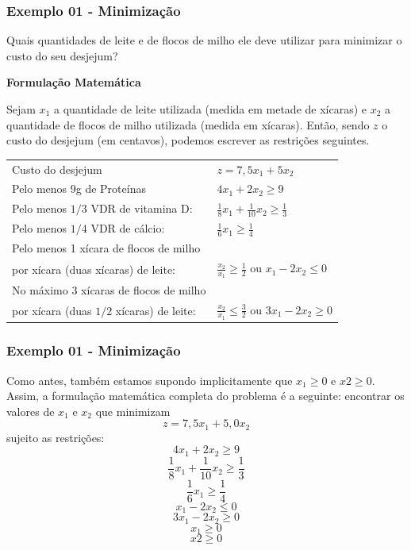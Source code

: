 \documentclass[hyperref={pdfpagelabels=false}]{beamer}
\begin{document}
\begin{frame}
\frametitle{Exemplo 01 - Minimização}

Quais quantidades de leite e de flocos de milho ele deve utilizar para minimizar o custo do seu desjejum? \pause

{\bf Formulação Matemática}

Sejam $x_1$ a quantidade de leite utilizada (medida em metade de xícaras) e $x_2$ a quantidade de flocos de milho utilizada (medida em xícaras). Então, sendo $z$ o custo do desjejum (em centavos), podemos escrever as restrições seguintes.

\begin{table}[h]
	\centering
	\begin{tabular}{ll}
		\hline
		Custo do desjejum		&	$z = 7,5x_1 + 5x_2$ \\
		Pelo menos $9$g de Proteínas	&	$4x_1+2x_2\geq 9$ \\
		Pelo menos $1/3$  VDR de vitamina D: &	$\frac{1}{8}x_1+\frac{1}{10}x_2 \geq \frac{1}{3}$ \\
		Pelo menos $1/4$ VDR de cálcio:	&	$\frac{1}{6}x_1 \geq \frac{1}{4}$ \\
		Pelo menos 1 xícara de flocos de milho \\ por xícara (duas  xícaras) de leite: & $\frac{x_2}{x_1}\geq \frac{1}{2}$ ou $x_1-2x_2 \leq 0$ \\
		No máximo 3 xícaras de flocos de milho \\ por xícara (duas $1/2$  xícaras) de leite: & $\frac{x_2}{x_1} \leq \frac{3}{2}$ ou $3x_1 - 2x_2 \geq 0$ \\
		\hline
	\end{tabular}
\end{table}

\end{frame}


\begin{frame}
\frametitle{Exemplo 01 - Minimização}

Como antes, também estamos supondo implicitamente que $x_1 \geq 0$ e $x2 \geq 0$. Assim, a formulação matemática completa do problema é a seguinte: encontrar os valores de $x_1$ e $x_2$ que minimizam
$$z = 7,5x_1 + 5,0x_2$$
sujeito as restrições:
$$4x_1+2x_2\geq 9$$
$$\frac{1}{8}x_1+\frac{1}{10}x_2 \geq \frac{1}{3}$$
$$\frac{1}{6}x_1 \geq \frac{1}{4}$$
$$ x_1-2x_2 \leq 0 $$
$$ 3x_1 - 2x_2 \geq 0 $$
$$ x_1 \geq 0 $$
$$ x2 \geq 0 $$
\end{frame}
\end{document}
